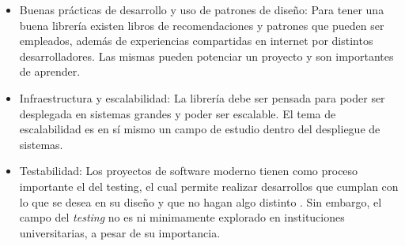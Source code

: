 \begin{itemize}
	\item Buenas prácticas de desarrollo y uso de patrones de diseño: Para tener
	      una buena librería existen libros de recomendaciones y patrones que
	      pueden ser empleados, además de experiencias compartidas en internet por
	      distintos desarrolladores.  Las mismas pueden potenciar un proyecto y
	      son importantes de aprender.

	\item Infraestructura y escalabilidad: La librería debe ser pensada para
	      poder ser desplegada en sistemas grandes y poder ser escalable. El tema
	      de escalabilidad es en sí mismo un campo de estudio dentro del
	      despliegue de sistemas.

	\item Testabilidad: Los proyectos de software moderno tienen como proceso
	      importante el del testing, el cual permite realizar desarrollos que cumplan con
	      lo que se desea en su diseño y que no hagan algo distinto \parencite{myersArtSoftwareTesting2012}.
	      Sin embargo, el campo del \textit{testing} no es ni minimamente explorado en
	      instituciones universitarias, a pesar de su importancia.
\end{itemize}